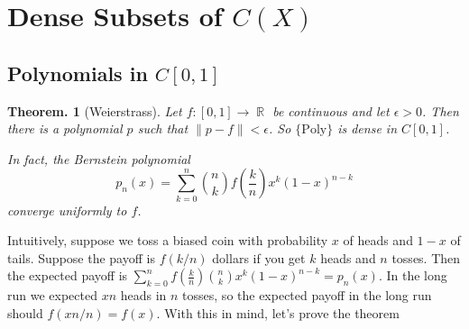 \documentclass[11pt, a4paper]{memoir}
\DeclareMathOperator{\R}{{\mathbb{R}}}
\newcommand{\norm}[1]{\ensuremath{\left\lVert#1\right\rVert}}
\theoremstyle{change}
\newtheorem{theorem}{Theorem.}[section]
\theoremstyle{plain}
\theoremstyle{nonumberplain}
\numberwithin{equation}{section}
\begin{document}
\section{Dense Subsets of \texorpdfstring{$C(X)$}{C(X)}}
\subsection{Polynomials in \texorpdfstring{$C[0,1]$}{C01}}
\begin{theorem}[Weierstrass]
    Let $f:[0,1]\to\R$ be continuous and let $\epsilon>0$.
    Then there is a polynomial $p$ such that $\norm{p-f}<\epsilon$. So $\{\text{Poly}\}$ is dense in $C[0,1]$.

    In fact, the Bernstein polynomial
    \[p_n(x)=\sum\limits_{k=0}^n\binom{n}{k}f\left(\frac{k}{n}\right)x^k(1-x)^{n-k}\]
    converge uniformly to $f$.
\end{theorem}
Intuitively, suppose we toss a biased coin with probability $x$ of heads and $1-x$ of tails.
Suppose the payoff is $f(k/n)$ dollars if you get $k$ heads and $n$ tosses.
Then the expected payoff is $\sum\limits_{k=0}^nf\left(\frac{k}{n}\right)\binom{n}{k}x^k(1-x)^{n-k}=p_n(x)$.
In the long run we expected $xn$ heads in $n$ tosses, so the expected payoff in the long run should $f(xn/n)=f(x)$.
With this in mind, let's prove the theorem
\end{document}
